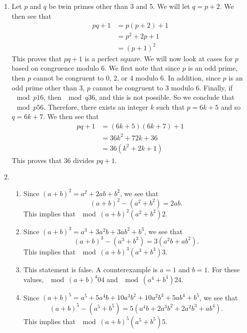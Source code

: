 \begin{enumerate}
\begin{enumerate}
\end{enumerate}



\item Let $p$ and $q$ be twin primes other than 3 and 5.  We will let $q = p + 2$.  We then see that
\begin{align*}
pq + 1 &= p(p + 2) + 1 \\
       &= p^2 + 2p + 1 \\
       &= (p + 1)^2
\end{align*}
This proves that $pq + 1$ is a perfect square.  We will now look at cases for $p$ based on congruence modulo 6.  We first note that since $p$ is an odd prime, then $p$ cannot be congruent to 0, 2, or 4 modulo 6.  In addition, since $p$ is an odd prime other than 3, $p$ cannot be congruent to 3 modulo 6.  Finally, if $\mod{p}{1}{6}$, then $\mod{q}{3}{6}$, and this is not possible.  So we conclude that $\mod{p}{5}{6}$.  Therefore, there exists an integer $k$ such that $p = 6k + 5$ and so $q = 6k + 7$.  We then see that
\begin{align*}
pq + 1 &= (6k + 5)(6k + 7) + 1 \\
       &= 36k^2 + 72k + 36 \\
       &= 36 \left( k^2 + 2k + 1 \right)
\end{align*}
This proves that 36 divides $pq + 1$.


\item \begin{enumerate}
\item Since $(a + b)^2 = a^2 + 2ab + b^2$, we see that 
\[
(a + b)^2 - \left( a^2 + b^2 \right) = 2ab.
\]
This implies that $\mod{(a + b)^2}{\left( a^2 + b^2 \right)}{2}$.

\item Since $(a + b)^3 = a^3 + 3a^2 b + 3a b^2 + b^3$, we see that 
\[
(a + b)^3 - \left( a^3 + b^3 \right) = 3 \left( a^2 b + a b^2 \right).
\]
This implies that $\mod{(a + b)^3}{\left( a^3 + b^3 \right)}{3}$.

\item This statement is false.  A counterexample is $a = 1$ and $b = 1$.  For these values, 
$\mod{(a + b)^4}{0}{4}$ and $\mod{\left( a^4 + b^4 \right)}{2}{4}$.

\item Since $(a + b)^5 = a^5 + 5a^4 b + 10 a^3 b^2 + 10 a^2 b^3 + 5a b^4 + b^5$, we see that 
\[
(a + b)^5 - \left( a^5 + b^5 \right) = 5 \left( a^4 b + 2a^3 b^2 + 2a^2 b^3+ a b^4 \right).
\]
This implies that $\mod{(a + b)^5}{\left( a^5 + b^5 \right)}{5}$.
\end{enumerate}




\end{enumerate}
